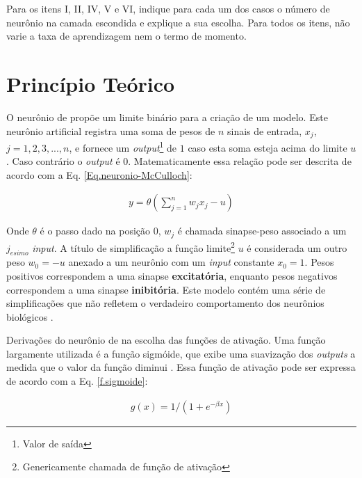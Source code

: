 \documentclass[journal, a4paper]{IEEEtran}
\begin{document}
Para os itens I, II, IV, V e VI, indique para cada um dos casos o número de neurônio na
camada escondida e explique a sua escolha. Para todos os itens, não varie a taxa de
aprendizagem nem o termo de momento.



\section{Princípio Teórico}
O neurônio de \citet{McCulloch1943} propõe um limite binário para a criação de um modelo. Este neurônio artificial registra uma soma de pesos de $n$ sinais de entrada, $x_{j}$, $j=1,2,3,...,n$, e fornece um \textit{output}\footnote{Valor de saída} de $1$ caso esta soma esteja acima do limite $u$. Caso contrário o \textit{output} é $0$. Matematicamente essa relação pode ser descrita de acordo com a Eq. \ref{Eq.neuronio-McCulloch}:

\begin{eqnarray}
y=\theta \left( \sum^{n}_{j=1} w_{j} x_{j} -u \right)
\label{Eq.neuronio-McCulloch}
\end{eqnarray}

Onde $\theta$ é o passo dado na posição $0$, $w_{j}$ é chamada sinapse-peso associado a um $j_{esimo}$ \textit{input}. A título de simplificação a função limite\footnote{Genericamente chamada de função de ativação} $u$ é considerada um outro peso $w_{0}=-u$ anexado a um neurônio com um \textit{input} constante $x_{0}=1$. Pesos positivos correspondem a uma sinapse \textbf{excitatória}, enquanto pesos negativos correspondem a uma sinapse \textbf{inibitória}. Este modelo contém uma série de simplificações que não refletem o verdadeiro comportamento dos neurônios biológicos \citep{Mao1996}.  

Derivações do neurônio de \citet{McCulloch1943} na escolha das funções de ativação. Uma função largamente utilizada é a função sigmóide, que exibe uma suavização dos \textit{outputs} a medida que o valor da função diminui \citep{Mao1996,Misra2010}. Essa função de ativação pode ser expressa de acordo com a Eq. \ref{f.sigmoide}:

\begin{eqnarray}
g(x)=1/(1+e^{-\beta x})
\label{f.sigmoide}
\end{eqnarray}
\end{document}
